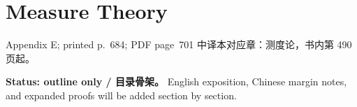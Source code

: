 \chapter{Measure Theory}
\label{app:measure-theory}

\PDESource
  {Appendix E; printed p.~684; PDF page~701}
  {中译本对应章：测度论，书内第 490 页起。}

\noindent\textbf{Status: outline only / 目录骨架。}
English exposition, Chinese margin notes, and expanded proofs will be added section by section.






